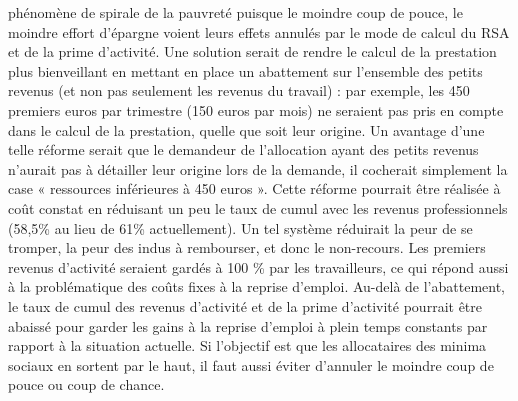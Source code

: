 \documentclass[
  french,
]{article}
\begin{document}
phénomène de spirale de la pauvreté puisque le moindre coup de pouce, le
moindre effort d'épargne voient leurs effets annulés par le mode de
calcul du RSA et de la prime d'activité. Une solution serait de rendre
le calcul de la prestation plus bienveillant en mettant en place un
abattement sur l'ensemble des petits revenus (et non pas seulement les
revenus du travail) : par exemple, les 450 premiers euros par trimestre
(150 euros par mois) ne seraient pas pris en compte dans le calcul de la
prestation, quelle que soit leur origine. Un avantage d'une telle
réforme serait que le demandeur de l'allocation ayant des petits revenus
n'aurait pas à détailler leur origine lors de la demande, il cocherait
simplement la case « ressources inférieures à 450 euros ». Cette réforme
pourrait être réalisée à coût constat en réduisant un peu le taux de
cumul avec les revenus professionnels (58,5\% au lieu de 61\%
actuellement). Un tel système réduirait la peur de se tromper, la peur
des indus à rembourser, et donc le non-recours. Les premiers revenus
d'activité seraient gardés à 100 \% par les travailleurs, ce qui répond
aussi à la problématique des coûts fixes à la reprise d'emploi. Au-delà
de l'abattement, le taux de cumul des revenus d'activité et de la prime
d'activité pourrait être abaissé pour garder les gains à la reprise
d'emploi à plein temps constants par rapport à la situation actuelle. Si
l'objectif est que les allocataires des minima sociaux en sortent par le
haut, il faut aussi éviter d'annuler le moindre coup de pouce ou coup de
chance.
\end{document}
